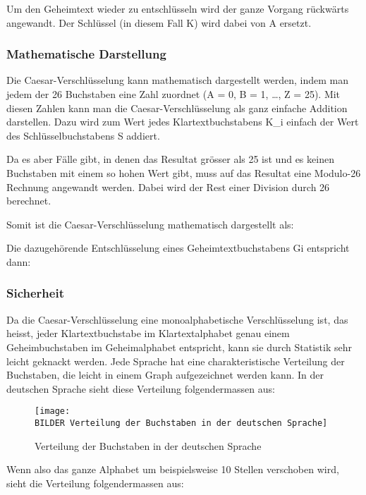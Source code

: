 Um den Geheimtext wieder zu entschlüsseln wird der ganze Vorgang rückwärts angewandt. Der Schlüssel (in diesem Fall K) wird dabei von A ersetzt.

\subsubsection{Mathematische Darstellung}
\label{sec:c-mathematische-darstellung}
Die Caesar-Verschlüsselung kann mathematisch dargestellt werden, indem man jedem der 26 Buchstaben eine Zahl zuordnet (A = 0, B = 1, \ldots, Z = 25). Mit diesen Zahlen kann man die Caesar-Verschlüsselung als ganz einfache Addition darstellen. Dazu wird zum Wert jedes Klartextbuchstabens K\_{i} einfach der Wert des Schlüsselbuchstabens S addiert.

Da es aber Fälle gibt, in denen das Resultat grösser als 25 ist und es keinen Buchstaben mit einem so hohen Wert gibt, muss auf das Resultat eine Modulo-26 Rechnung angewandt werden. Dabei wird der Rest einer Division durch 26 berechnet.

Somit ist die Caesar-Verschlüsselung mathematisch dargestellt als:


Die dazugehörende Entschlüsselung eines Geheimtextbuchstabens Gi entspricht dann:



\subsubsection{Sicherheit}
\label{sec:c-sicherheit}
Da die Caesar-Verschlüsselung eine monoalphabetische Verschlüsselung ist, das heisst, jeder Klartextbuchstabe im Klartextalphabet genau einem Geheimbuchstaben im Geheimalphabet entspricht, kann sie durch Statistik sehr leicht geknackt werden. Jede Sprache hat eine charakteristische Verteilung der Buchstaben, die leicht in einem Graph aufgezeichnet werden kann. In der deutschen Sprache sieht diese Verteilung folgendermassen aus:

\begin{figure}[htb]  %
	\centering
		\texttt{[image: \\BILDER Verteilung der Buchstaben in der deutschen Sprache]}
 	\caption{Verteilung der Buchstaben in der deutschen Sprache \cite{img:citekey}}
  \label{fig:verteilung-buchstaben-de}
\end{figure}

Wenn also das ganze Alphabet um beispielsweise 10 Stellen verschoben wird, sieht die Verteilung folgendermassen aus:

